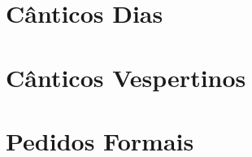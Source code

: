 
\morningPartSettings

\part{Cânticos Dias}

\morningChapterSettings



\morningSettingsRestore

\eveningPartSettings

\part{Cânticos Vespertinos}

\eveningChapterSettings



\eveningSettingsRestore

%
%
%
%
%
%
%

\requestsPartSettings

\part{Pedidos Formais}

\requestsChapterSettings



\requestsSettingsRestore

